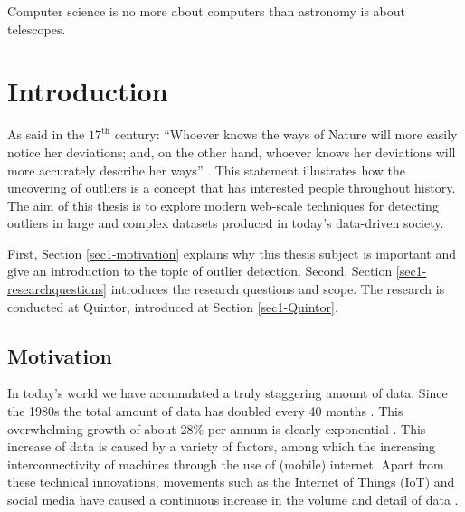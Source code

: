\begin{savequote}[100mm] 
Computer science is no more about computers than astronomy is about telescopes.  
\end{savequote}

\chapter{Introduction \label{chap1:introduction}}

As said in the $17^{\text{th}}$ century: ``Whoever knows the ways of Nature will more easily notice her deviations; and, on the other hand, whoever knows her deviations will more accurately describe her ways'' \cite{bacon2010novum}. This statement illustrates how the uncovering of outliers is a concept that has interested people throughout history. The aim of this thesis is to explore modern web-scale techniques for detecting outliers in large and complex datasets produced in today's data-driven society.

First, Section \ref{sec1-motivation} explains why this thesis subject is important and give an introduction to the topic of outlier detection. Second, Section \ref{sec1-researchquestions} introduces the research questions and scope. The research is conducted at Quintor, introduced at Section \ref{sec1-Quintor}.

\section{Motivation \label{sec1-motivation}}
In today's world we have accumulated a truly staggering amount of data. Since the 1980s the total amount of data has doubled every 40 months \cite{Hilbert01042011}. This overwhelming growth of about 28\% per annum is clearly exponential \cite{6479953}. This increase of data is caused by a variety of factors, among which the increasing interconnectivity of machines through the use of (mobile) internet. Apart from these technical innovations, movements such as the Internet of Things (IoT) and social media have caused a continuous increase in the volume and detail of data \cite{holler2014from}. 

